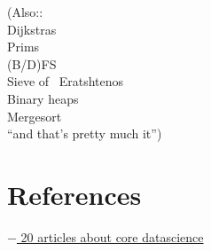 \documentclass[11pt]{article}
\begin{document}
\noindent
(Also:: \\
Dijkstras\\
Prims \\
(B/D)FS \\
Sieve of ~Eratshtenos \\
Binary heaps\\
Mergesort\\
``and that's pretty much it'')

\newpage
\section{References}
\href{http://www.datasciencecentral.com/profiles/blogs/20-articles-about-core-data-science}{$-$ 20 articles about core datascience}\\
\end{document}
